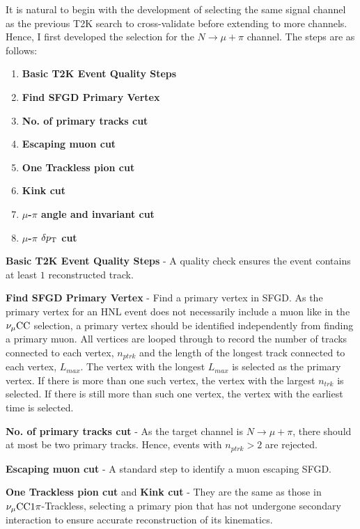         It is natural to begin with the development of selecting the same signal channel as the previous T2K search to cross-validate before extending to more channels. Hence, I first developed the selection for the $N\rightarrow\mu+\pi$ channel. The steps are as follows:

        \begin{enumerate}
            \item \textbf{Basic T2K Event Quality Steps} 
            \item \textbf{Find SFGD Primary Vertex} 
            \item \textbf{No. of primary tracks cut} 
            \item \textbf{Escaping muon cut} 
            \item \textbf{One Trackless pion cut}
            \item \textbf{Kink cut}
            \item \textbf{$\mu$-$\pi$ angle and invariant cut}
            \item \textbf{$\mu$-$\pi$ $\delta p_\textrm{T}$ cut}
        \end{enumerate}

        \textbf{Basic T2K Event Quality Steps} - A quality check ensures the event contains at least $1$ reconstructed track.

        \textbf{Find SFGD Primary Vertex} - Find a primary vertex in SFGD. 
        As the primary vertex for an HNL event does not necessarily include a muon like in the $\nu_{\mu}\textrm{CC}$ selection, a primary vertex should be identified independently from finding a primary muon. 
        All vertices are looped through to record the number of tracks connected to each vertex, $n_{ptrk}$ and the length of the longest track connected to each vertex, $L_{max}$. 
        The vertex with the longest $L_{max}$ is selected as the primary vertex. 
        If there is more than one such vertex, the vertex with the largest $n_{trk}$ is selected. 
        If there is still more than such one vertex, the vertex with the earliest time is selected.

        \textbf{No. of primary tracks cut} - As the target channel is $N\rightarrow\mu+\pi$, there should at most be two primary tracks. Hence, events with $n_{ptrk}>2$ are rejected.

        \textbf{Escaping muon cut} - A standard step to identify a muon escaping SFGD.

        \textbf{One Trackless pion cut} and \textbf{Kink cut} - They are the same as those in $\nu_{\mu}\textrm{CC}1\pi$-Trackless, selecting a primary pion that has not undergone secondary interaction to ensure accurate reconstruction of its kinematics.

